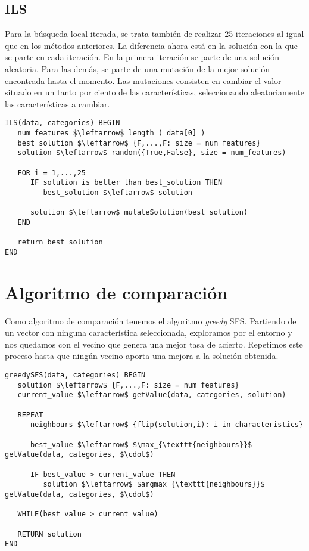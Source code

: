 \documentclass[11pt,leqno]{article}
\begin{document}
	
	
\subsection{ILS}

	Para la búsqueda local iterada, se trata también de realizar 25 iteraciones al igual que en los métodos anteriores. La diferencia ahora está en la solución con la que se parte en cada iteración. En la primera iteración se parte de una solución aleatoria. Para las demás, se parte de una mutación de la mejor solución encontrada hasta el momento. Las mutaciones consisten en cambiar el valor situado en un tanto por ciento de las características, seleccionando aleatoriamente las características a cambiar.

	\begin{lstlisting}[mathescape=true]
ILS(data, categories) BEGIN	
   num_features $\leftarrow$ length ( data[0] )
   best_solution $\leftarrow$ {F,...,F: size = num_features}
   solution $\leftarrow$ random({True,False}, size = num_features)
   
   FOR i = 1,...,25
      IF solution is better than best_solution THEN
         best_solution $\leftarrow$ solution
         
      solution $\leftarrow$ mutateSolution(best_solution)      
   END
	
   return best_solution
END
	\end{lstlisting}
	
\section{Algoritmo de comparación}

Como algoritmo de comparación tenemos el algoritmo \textit{greedy} SFS. Partiendo de un vector con ninguna característica seleccionada, exploramos por el entorno y nos quedamos con el vecino que genera una mejor tasa de acierto. Repetimos este proceso hasta que ningún vecino aporta una mejora a la solución obtenida.

	\begin{lstlisting}[mathescape=true]
greedySFS(data, categories) BEGIN
   solution $\leftarrow$ {F,...,F: size = num_features}
   current_value $\leftarrow$ getValue(data, categories, solution)
   
   REPEAT
      neighbours $\leftarrow$ {flip(solution,i): i in characteristics}
   
      best_value $\leftarrow$ $\max_{\texttt{neighbours}}$ getValue(data, categories, $\cdot$)
      
      IF best_value > current_value THEN
         solution $\leftarrow$ $argmax_{\texttt{neighbours}}$ getValue(data, categories, $\cdot$)
   
   WHILE(best_value > current_value)
   
   RETURN solution
END
	\end{lstlisting}
\end{document}
